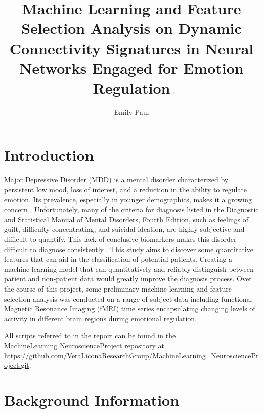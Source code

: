 \documentclass[12pt]{report}
\title{Machine Learning and Feature Selection Analysis on Dynamic Connectivity Signatures in Neural Networks Engaged for Emotion Regulation}
\author{Emily Paul}
\begin{document}
	
	\maketitle
	\tableofcontents
	
	\chapter{Introduction}
	Major Depressive Disorder (MDD) is a mental disorder characterized by persistent low mood, loss of interest, and a reduction in the ability to regulate emotion. Its prevalence, especially in younger demographics, makes it a growing concern \cite{nimh_2019}. Unfortunately, many of the criteria for diagnosis listed in the Diagnostic and Statistical Manual of Mental Disorders, Fourth Edition, such as feelings of guilt, difficulty concentrating, and suicidal ideation, are highly subjective and difficult to quantify. This lack of conclusive biomarkers makes this disorder difficult to diagnose consistently \cite{lemelin1994depression}. This study aims to discover some quantitative features that can aid in the classification of potential patients. Creating a machine learning model that can quantitatively and reliably distinguish between patient and non-patient data would greatly improve the diagnosis process. Over the course of this project, some preliminary machine learning and feature selection analysis was conducted on a range of subject data including functional Magnetic Resonance Imaging (fMRI) time series encapsulating changing levels of activity in different brain regions during emotional regulation.
	
	All scripts referred to in the report can be found in the \\ MachineLearning$\_$NeuroscienceProject repository at  \url{https://github.com/VeraLiconaResearchGroup/MachineLearning_NeuroscienceProject.git}.
	
	\chapter{Background Information}
\end{document}
